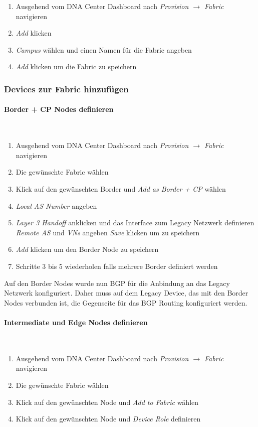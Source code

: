 \begin{enumerate}
	\item Ausgehend vom DNA Center Dashboard nach \textit{Provision $\rightarrow$ Fabric} navigieren
	\item \textit{Add} klicken
	\item \textit{Campus} wählen und einen Namen für die Fabric angeben
	\item \textit{Add} klicken um die Fabric zu speichern
\end{enumerate}

\subsubsection{Devices zur Fabric hinzufügen}
\paragraph{Border + CP Nodes definieren}
~\\
\begin{enumerate}
	\item Ausgehend vom DNA Center Dashboard nach \textit{Provision $\rightarrow$ Fabric} navigieren
	\item Die gewünschte Fabric wählen
	\item Klick auf den gewünschten Border und \textit{Add as Border + CP} wählen
	\item \textit{Local AS Number} angeben
	\item \textit{Layer 3 Handoff} anklicken und das Interface zum Legacy Netzwerk definieren
	\subitem \textit{Remote AS} und \textit{VNs} angeben
	\subitem \textit{Save} klicken um zu speichern
	\item \textit{Add} klicken um den Border Node zu speichern
	\item Schritte 3 bis 5 wiederholen falls mehrere Border definiert werden
\end{enumerate}
Auf den Border Nodes wurde nun BGP für die Anbindung an das Legacy Netzwerk konfiguriert. Daher muss auf dem Legacy Device, das mit den Border Nodes verbunden ist, die Gegenseite für das BGP Routing konfiguriert werden.

\paragraph{Intermediate und Edge Nodes definieren}
~\\
\begin{enumerate}
	\item Ausgehend vom DNA Center Dashboard nach \textit{Provision $\rightarrow$ Fabric} navigieren
	\item Die gewünschte Fabric wählen
	\item Klick auf den gewünschten Node und \textit{Add to Fabric} wählen
	\item Klick auf den gewünschten Node und \textit{Device Role} definieren
\end{enumerate}

